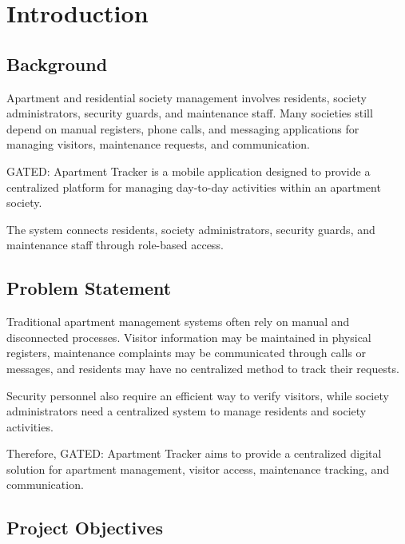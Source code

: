 \documentclass{tietreport}
\author{%
  \texttt{1024030101} Khushi Dangi \\
  \texttt{1024030115} Geetika Parakh \\
  \texttt{1024030121} Ridham Sharma \\
  \texttt{1024030937} Harnoor Singh
}
\begin{document}
\maketitle

\tableofcontents


\chapter{Introduction}

\section{Background}

Apartment and residential society management involves
residents, society administrators, security guards, and
maintenance staff. Many societies still depend on manual
registers, phone calls, and messaging applications for
managing visitors, maintenance requests, and
communication.

GATED: Apartment Tracker is a mobile application designed
to provide a centralized platform for managing
day-to-day activities within an apartment society.

The system connects residents, society administrators,
security guards, and maintenance staff through
role-based access.

\section{Problem Statement}

Traditional apartment management systems often rely on
manual and disconnected processes. Visitor information
may be maintained in physical registers, maintenance
complaints may be communicated through calls or messages,
and residents may have no centralized method to track
their requests.

Security personnel also require an efficient way to
verify visitors, while society administrators need a
centralized system to manage residents and society
activities.

Therefore, GATED: Apartment Tracker aims to provide a
centralized digital solution for apartment management,
visitor access, maintenance tracking, and communication.

\section{Project Objectives}
\end{document}
